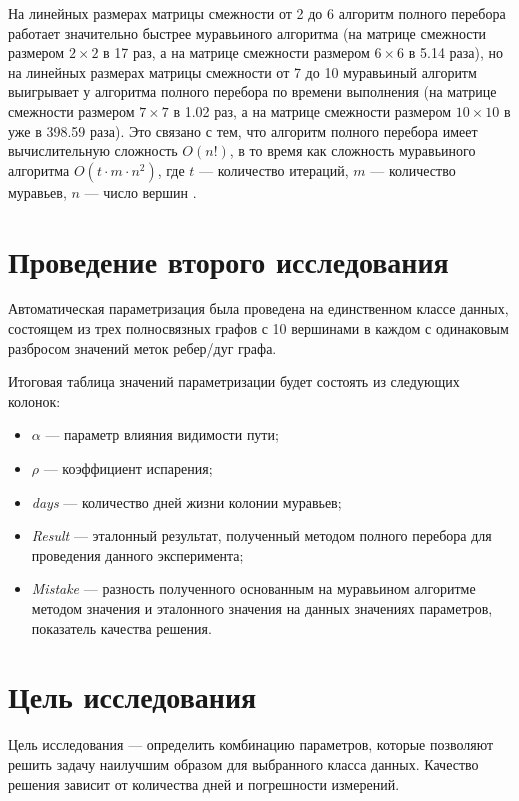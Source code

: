 На линейных размерах матрицы смежности от 2 до 6 алгоритм полного перебора работает значительно быстрее муравьиного алгоритма (на матрице смежности размером $2\times2$ в 17 раз, а на матрице смежности размером $6\times6$ в 5.14 раза), но на линейных размерах матрицы смежности от 7 до 10 муравьиный алгоритм выигрывает у алгоритма полного перебора по времени выполнения (на матрице смежности размером $7\times7$ в 1.02 раз, а на матрице смежности размером $10\times10$ в уже в 398.59 раза). Это связано с тем, что алгоритм полного перебора имеет вычислительную сложность $O(n!)$, в то время как сложность муравьиного алгоритма $O(t \cdot m \cdot n^2)$, где $t$ --- количество итераций, $m$ --- количество муравьев, $n$ --- число вершин \cite{info_compl_ant_alg}.

\clearpage

\section{Проведение второго исследования}

Автоматическая параметризация была проведена на единственном классе данных, состоящем из трех полносвязных графов с 10 вершинами в каждом с одинаковым разбросом значений меток ребер/дуг графа.

Итоговая таблица значений параметризации будет состоять из следующих колонок:
\begin{itemize}[label=---]
	\item $\alpha$ --- параметр влияния видимости пути;
	\item $\rho$ --- коэффициент испарения;
	\item \textit{days} --- количество дней жизни колонии муравьев;
	\item \textit{Result} --- эталонный результат, полученный методом полного перебора для проведения данного эксперимента;
	\item \textit{Mistake} --- разность полученного основанным на муравьином алгоритме методом значения и эталонного значения на данных значениях параметров, показатель качества решения.
\end{itemize}

\section*{Цель исследования}

Цель исследования --- определить комбинацию параметров, которые позволяют решить задачу наилучшим образом для выбранного класса данных. 
Качество решения зависит от количества дней и погрешности измерений.


